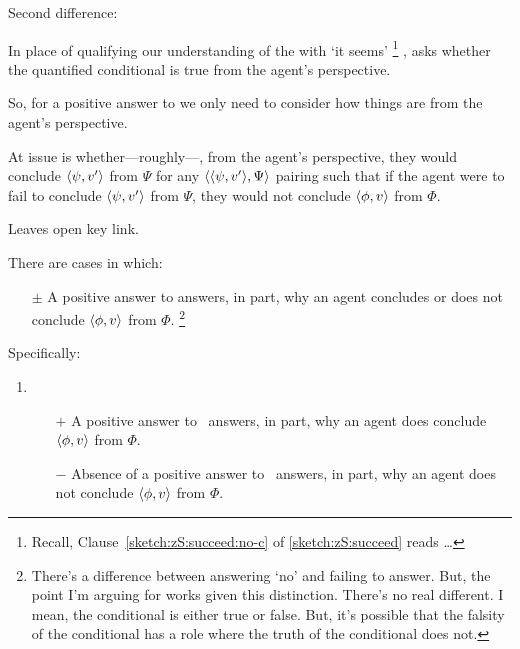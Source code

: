 \begin{note}
  Second difference:

  In place of qualifying our understanding of the \scen{} with `it seems'%
  \footnote{
    Recall, Clause~\ref{sketch:zS:succeed:no-c} of \autoref{sketch:zS:succeed} reads {\color{blue} \dots}
  }%
  , \qzS{} asks whether the quantified conditional is true from the agent's perspective.

  So, for a positive answer to \qzS{} we only need to consider how things are from the agent's perspective.

  At issue is whether---roughly---, from the agent's perspective, they would conclude \(\langle \psi, v' \rangle\) from \(\Psi\) for any \(\langle \langle \psi, v' \rangle, \Psi \rangle\) pairing such that if the agent were to fail to conclude \(\langle \psi, v' \rangle\) from \(\Psi\), they would not conclude \(\langle \phi, v \rangle\) from \(\Phi\).

  Leaves open key link.

  \begin{idea}
    \label{prop:qzS-answers-why}
    There are cases in which:

    \begin{itemize}
    \item[\(\pm\)]
      A positive answer to \qzS{} answers, in part, why an agent concludes or does not conclude \(\langle \phi, v \rangle\) from \(\Phi\).%
      \footnote{
        There's a difference between answering `no' and failing to answer.
    But, the point I'm arguing for works given this distinction.
    There's no real different.
    I mean, the conditional is either true or false.
    But, it's possible that the falsity of the conditional has a role where the truth of the conditional does not.
      }
    \end{itemize}

    Specifically:
    \begin{enumerate}[label=]
    \item
      \begin{itemize}
      \item[\(+\)]
        A positive answer to~\qzS{} answers, in part, why an agent does conclude \(\langle \phi, v \rangle\) from \(\Phi\).
      \item[\(-\)]
        Absence of a positive answer to~\qzS{} answers, in part, why an agent does not conclude \(\langle \phi, v \rangle\) from \(\Phi\).
      \end{itemize}
    \end{enumerate}
  \end{idea}


\end{note}

